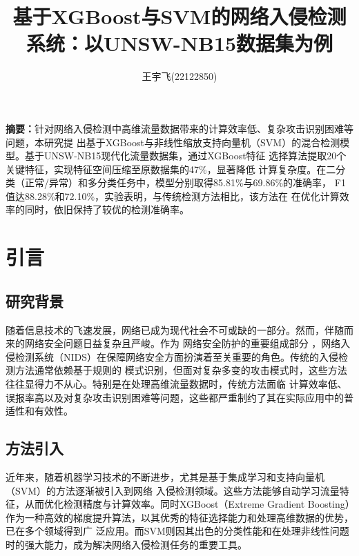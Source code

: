 \documentclass{article}
\title{\textbf{基于XGBoost与SVM的网络入侵检测系统：以UNSW-NB15数据集为例}}
\author{
王宇飞(22122850)
}
\begin{document}
 \songti


\date{}
\maketitle


\begin{center}
\setlength{\textwidth}{15cm}
\parbox{\textwidth}{
\textbf{摘要：}针对网络入侵检测中高维流量\cite{ref1}数据带来的计算效率低、复杂攻击识别困难等问题，本研究提
出基于XGBoost与非线性缩放支持向量机（SVM）的混合检测模型。基于UNSW-NB15现代化流量数据集，通过XGBoost特征
选择算法提取20个关键特征，实现特征空间压缩至原数据集的47\%，显著降低
计算复杂度。在二分类（正常/异常）和多分类任务中，模型分别取得85.81\%与69.86\%的准确率，
F1值达88.28\%和72.10\%，实验表明，与传统检测方法相比，该方法在
在优化计算效率的同时，依旧保持了较优的检测准确率。

  }
\end{center}

\section{引言}
\subsection{研究背景}
随着信息技术的飞速发展，网络已成为现代社会不可或缺的一部分。然而，伴随而来的网络安全问题日益复杂且严峻。作为
网络安全防护的重要组成部分
，网络入侵检测系统（NIDS）在保障网络安全方面扮演着至关重要的角色。传统的入侵检测方法通常依赖基于规则的
模式识别，但面对复杂多变的攻击模式时，这些方法往往显得力不从心。特别是在处理高维流量数据时，传统方法面临
计算效率低、误报率高以及对复杂攻击识别困难等问题，这些都严重制约了其在实际应用中的普适性和有效性。

\subsection{方法引入}
近年来，随着机器学习技术的不断进步，尤其是基于集成学习和支持向量机（SVM）的方法逐渐被引入到网络
入侵检测领域。这些方法能够自动学习流量特征，从而优化检测精度与计算效率。同时XGBoost（Extreme Gradient
 Boosting）作为一种高效的梯度提升算法，以其优秀的特征选择能力和处理高维数据的优势，已在多个领域得到广
 泛应用。而SVM则因其出色的分类性能和在处理非线性问题时的强大能力，成为解决网络入侵检测任务的重要工具。
\end{document}
